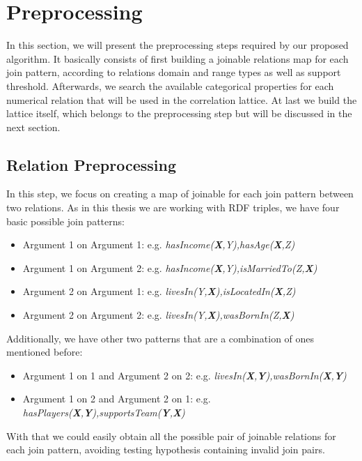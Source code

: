 \section{Preprocessing}

In this section, we will present the preprocessing steps required by our proposed algorithm. It basically consists of
first building a joinable relations map for each join pattern, according
to relations domain and range types as well as support threshold. Afterwards, we search the available categorical
properties for each numerical relation that will be used in the correlation lattice. At last we build the lattice
itself, which belongs to the preprocessing step but will be discussed in the next section.

\subsection{Relation Preprocessing}

In this step, we focus on creating a map of joinable for each join pattern between two relations. As in this thesis we
are working with RDF triples, we have four basic possible join patterns:

\begin{itemize}
 \item Argument 1 on Argument 1: e.g. \emph{hasIncome(\textbf{X},Y),hasAge(\textbf{X},Z)}
 \item Argument 1 on Argument 2: e.g. \emph{hasIncome(\textbf{X},Y),isMarriedTo(Z,\textbf{X})}
 \item Argument 2 on Argument 1: e.g. \emph{livesIn(Y,\textbf{X}),isLocatedIn(\textbf{X},Z)}
 \item Argument 2 on Argument 2: e.g. \emph{livesIn(Y,\textbf{X}),wasBornIn(Z,\textbf{X})}
\end{itemize}

Additionally, we have other two patterns that are a combination of ones mentioned before:

\begin{itemize}
 \item Argument 1 on 1 and Argument 2 on 2: e.g.
\emph{livesIn(\textbf{X},\textbf{Y}),wasBornIn(\textbf{X},\textbf{Y})}
 \item Argument 1 on 2 and Argument 2 on 1: e.g.
\emph{hasPlayers(\textbf{X},\textbf{Y}),supportsTeam(\textbf{Y},\textbf{X})}
\end{itemize}

With that we could easily obtain all the possible pair of joinable relations for each join pattern, avoiding testing
hypothesis containing invalid join pairs.

